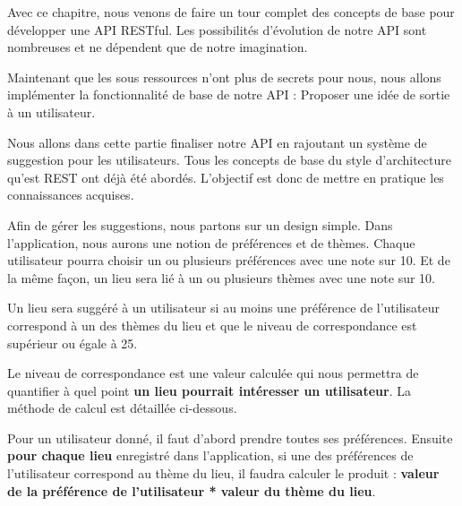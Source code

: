 \documentclass[big]{zmdocument}
\begin{document}
\horizontalLine



Avec ce chapitre, nous venons de faire un tour complet des concepts de base pour développer une API RESTful. 
Les possibilités d'évolution de notre API sont nombreuses et ne dépendent que de notre imagination.



Maintenant que les sous ressources n'ont plus de secrets pour nous, nous allons implémenter la fonctionnalité de base de notre API : Proposer une idée de sortie à un utilisateur.





Nous allons dans cette partie finaliser notre API en rajoutant un système de suggestion pour les utilisateurs. Tous les concepts de base du style d'architecture qu'est REST ont déjà été abordés. L'objectif est donc de mettre en pratique les connaissances acquises.





Afin de gérer les suggestions, nous partons sur un design simple. Dans l'application, nous aurons une notion de préférences et de thèmes. Chaque utilisateur pourra choisir un ou plusieurs préférences avec une note sur 10. Et de la même façon, un lieu sera lié à un ou plusieurs thèmes avec une note sur 10.



Un lieu sera suggéré à un utilisateur si au moins une préférence de l'utilisateur correspond à un des thèmes du lieu et que le niveau de correspondance est supérieur ou égale à 25.



\begin{Information}
Le niveau de correspondance est une valeur calculée qui nous permettra de quantifier à quel point \textbf{un lieu pourrait intéresser un utilisateur}. La méthode de calcul est détaillée ci-dessous.
\end{Information}


Pour un utilisateur donné, il faut d'abord prendre toutes ses préférences.
Ensuite \textbf{pour chaque lieu} enregistré dans l'application, si une des préférences de l'utilisateur correspond au thème du lieu, il faudra calculer le produit : \textbf{valeur de la préférence de l'utilisateur * valeur du thème du lieu}.
\end{document}
